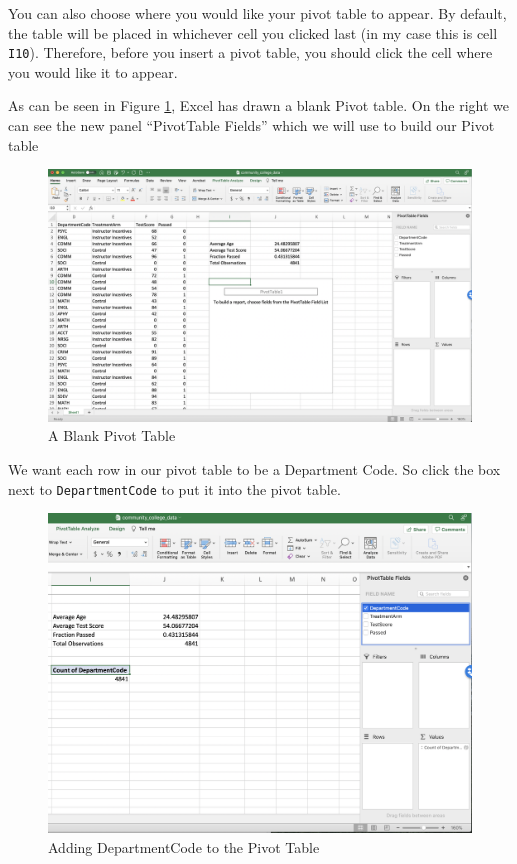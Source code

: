 \documentclass[
]{book}
\begin{document}
You can also choose where you would like your pivot table to appear. By default, the table will be placed in whichever cell you clicked last (in my case this is cell \texttt{I10}). Therefore, before you insert a pivot table, you should click the cell where you would like it to appear.

As can be seen in Figure \ref{fig:pivot4}, Excel has drawn a blank Pivot table. On the right we can see the new panel ``PivotTable Fields'' which we will use to build our Pivot table

\begin{figure}

{\centering \includegraphics[width=1\linewidth]{images/01_pivot4} 

}

\caption{A Blank Pivot Table}\label{fig:pivot4}
\end{figure}

We want each row in our pivot table to be a Department Code. So click the box next to \texttt{DepartmentCode} to put it into the pivot table.

\begin{figure}

{\centering \includegraphics[width=1\linewidth]{images/01_pivot5} 

}

\caption{Adding DepartmentCode to the Pivot Table}\label{fig:pivot5}
\end{figure}
\end{document}
